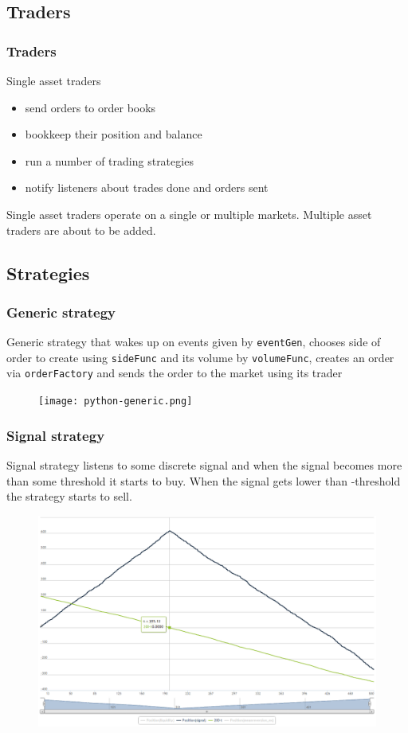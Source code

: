 \documentclass{beamer}
\begin{document}
\subsection{Traders}
\begin{frame}
\frametitle{Traders}
Single asset traders
\begin{itemize}
  \item send orders to order books
  \item bookkeep their position and balance
  \item run a number of trading strategies
  \item notify listeners about trades done and orders sent
\end{itemize}
Single asset traders operate on a single or multiple markets.
Multiple asset traders are about to be added.
\end{frame}

\subsection{Strategies}
\begin{frame}
\frametitle{Generic strategy}
Generic strategy that wakes up on events given by \texttt{eventGen},
chooses side of order to create using \texttt{sideFunc} and its volume by \texttt{volumeFunc},
creates an order via \texttt{orderFactory} and sends the order to the market using its trader
\begin{figure}[htbp]
\centering
\texttt{[image: python-generic.png]}
\end{figure}
\end{frame}


\begin{frame}
\frametitle{Signal strategy}
Signal strategy listens to some discrete signal and when the signal becomes more than some threshold it starts to buy. When the signal gets lower than -threshold the strategy starts to sell.
\begin{figure}[htbp]
\centering
\includegraphics[width=1\linewidth]{signal.png}
\end{figure}
\end{frame}
\end{document}
